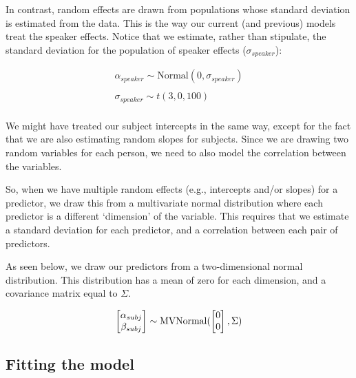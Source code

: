 \documentclass[
]{book}
\begin{document}
In contrast, random effects are drawn from populations whose standard deviation is estimated from the data. This is the way our current (and previous) models treat the speaker effects. Notice that we estimate, rather than stipulate, the standard deviation for the population of speaker effects (\(\sigma_{speaker}\)):

\begin{equation}
\begin{split}
\alpha_{speaker} \sim \mathrm{Normal}(0,\sigma_{speaker}) \\ \\  
\sigma_{speaker} \sim t(3, 0, 100) \\ 
\end{split}
\label{eq:611}
\end{equation}

We might have treated our subject intercepts in the same way, except for the fact that we are also estimating random slopes for subjects. Since we are drawing two random variables for each person, we need to also model the correlation between the variables.

So, when we have multiple random effects (e.g., intercepts and/or slopes) for a predictor, we draw this from a multivariate normal distribution where each predictor is a different `dimension' of the variable. This requires that we estimate a standard deviation for each predictor, and a correlation between each pair of predictors.

As seen below, we draw our predictors from a two-dimensional normal distribution. This distribution has a mean of zero for each dimension, and a covariance matrix equal to \(\Sigma\).

\[
\begin{bmatrix} \alpha_{subj} \\ \beta_{subj} \\ \end{bmatrix}  
\sim \mathrm{MVNormal} ( \begin{bmatrix} 0 \\ 0 \\ \end{bmatrix}, \Sigma) \\ \\
\label{eq:612}
\]

\hypertarget{fitting-the-model-7}{%
\subsection{Fitting the model}\label{fitting-the-model-7}}
\end{document}
